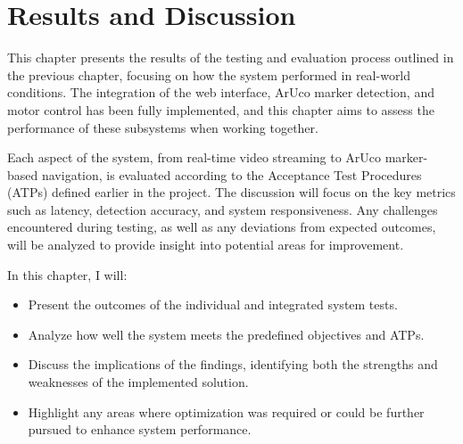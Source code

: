 \chapter{Results and Discussion}

This chapter presents the results of the testing and evaluation process outlined in the previous chapter, focusing on how the system performed in real-world conditions. The integration of the web interface, ArUco marker detection, and motor control has been fully implemented, and this chapter aims to assess the performance of these subsystems when working together. 

Each aspect of the system, from real-time video streaming to ArUco marker-based navigation, is evaluated according to the Acceptance Test Procedures (ATPs) defined earlier in the project. The discussion will focus on the key metrics such as latency, detection accuracy, and system responsiveness. Any challenges encountered during testing, as well as any deviations from expected outcomes, will be analyzed to provide insight into potential areas for improvement.

In this chapter, I will:
\begin{itemize}
	\item Present the outcomes of the individual and integrated system tests.
	\item Analyze how well the system meets the predefined objectives and ATPs.
	\item Discuss the implications of the findings, identifying both the strengths and weaknesses of the implemented solution.
	\item Highlight any areas where optimization was required or could be further pursued to enhance system performance.
\end{itemize}


